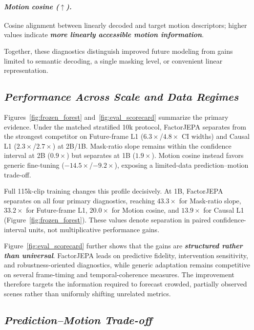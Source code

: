 \paragraph{\textbf{\emph{Motion cosine ($\uparrow$).}}}
Cosine alignment between linearly decoded and target motion descriptors; higher
values indicate \textbf{\emph{more linearly accessible motion information}}.

Together, these diagnostics distinguish improved future modeling from gains
limited to semantic decoding, a single masking level, or convenient linear
representation.

\subsection{\textbf{\emph{Performance Across Scale and Data Regimes}}}

Figures~\ref{fig:frozen_forest} and~\ref{fig:eval_scorecard} summarize the
primary evidence. Under the matched stratified 10k protocol, FactorJEPA
separates from the strongest competitor on Future-frame L1
($6.3\times$/$4.8\times$ CI widths) and Causal L1
($2.3\times$/$2.7\times$) at 2B/1B. Mask-ratio slope remains within the
confidence interval at 2B ($0.9\times$) but separates at 1B
($1.9\times$). Motion cosine instead favors generic fine-tuning
($-14.5\times$/$-9.2\times$), exposing a limited-data
prediction--motion trade-off.

Full 115k-clip training changes this profile decisively. At 1B, FactorJEPA
separates on all four primary diagnostics, reaching
\textbf{\emph{$43.3\times$}} for Mask-ratio slope,
\textbf{\emph{$33.2\times$}} for Future-frame L1,
\textbf{\emph{$20.0\times$}} for Motion cosine, and
\textbf{\emph{$13.9\times$}} for Causal L1
(Figure~\ref{fig:frozen_forest}). These values denote separation in paired
confidence-interval units, not multiplicative performance gains.

Figure~\ref{fig:eval_scorecard} further shows that the gains are
\textbf{\emph{structured rather than universal}}. FactorJEPA leads on
predictive fidelity, intervention sensitivity, and robustness-oriented
diagnostics, while generic adaptation remains competitive on several
frame-timing and temporal-coherence measures. The improvement therefore targets
the information required to forecast crowded, partially observed scenes rather
than uniformly shifting unrelated metrics.

\subsection{\textbf{\emph{Prediction--Motion Trade-off}}}

